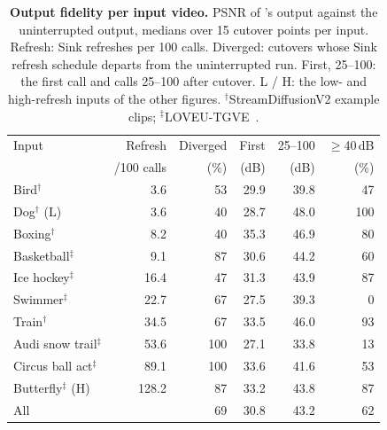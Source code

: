 

\begin{table}[t]
  \centering
  \small
  \caption{\textbf{Output fidelity per input video.} PSNR of \sys's output against the uninterrupted output,
    medians over 15 cutover points per input. Refresh: Sink refreshes per 100 calls. Diverged: cutovers whose Sink
    refresh schedule departs from the uninterrupted run. First, 25--100: the first call and calls 25--100 after
    cutover. L / H: the low- and high-refresh inputs of the other figures.
    $^\dagger$StreamDiffusionV2 example clips; $^\ddagger$LOVEU-TGVE~\cite{loveu}.}
  \label{tab:fidelity}
  \setlength{\tabcolsep}{3pt}
  \begin{tabular*}{\columnwidth}{@{\extracolsep{\fill}}lrrrrr@{}}
    \toprule
    Input & Refresh & Diverged & First & 25--100 & $\geq$40\,dB \\
          & /100 calls & (\%) & (dB) & (dB) & (\%) \\
    \midrule
    Bird$^\dagger$ & 3.6 & 53 & 29.9 & 39.8 & 47 \\
    Dog$^\dagger$ (L) & 3.6 & 40 & 28.7 & 48.0 & 100 \\
    Boxing$^\dagger$ & 8.2 & 40 & 35.3 & 46.9 & 80 \\
    Basketball$^\ddagger$ & 9.1 & 87 & 30.6 & 44.2 & 60 \\
    Ice hockey$^\ddagger$ & 16.4 & 47 & 31.3 & 43.9 & 87 \\
    Swimmer$^\ddagger$ & 22.7 & 67 & 27.5 & 39.3 & 0 \\
    Train$^\dagger$ & 34.5 & 67 & 33.5 & 46.0 & 93 \\
    Audi snow trail$^\ddagger$ & 53.6 & 100 & 27.1 & 33.8 & 13 \\
    Circus ball act$^\ddagger$ & 89.1 & 100 & 33.6 & 41.6 & 53 \\
    Butterfly$^\ddagger$ (H) & 128.2 & 87 & 33.2 & 43.8 & 87 \\
    \midrule
    All & & 69 & 30.8 & 43.2 & 62 \\
    \bottomrule
  \end{tabular*}
\end{table}
